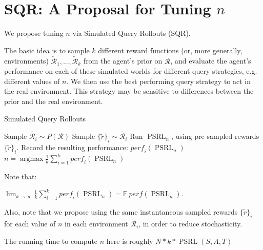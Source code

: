 \documentclass{article}
\begin{document}
\section{SQR: A Proposal for Tuning $n$}
We propose tuning $n$ via Simulated Query Rollouts (SQR). 

The basic idea is to sample $k$ different reward functions (or, more generally, environments) $\mathcal{\tilde{R}}_1, ..., \mathcal{\tilde{R}}_k$ from the agent's prior on $\mathcal{R}$, and evaluate the agent's performance on each of these simulated worlds for different query strategies, e.g. different values of $n$.
We then use the best performing query strategy to act in the real environment.
This strategy may be sensitive to differences between the prior and the real environment.



\begin{algorithm}
\caption{Simulated Query Rollouts}
\label{SQR}
\begin{algorithmic}[1]
	\State Sample $\tilde{\mathcal{R}_i} \sim P(\mathcal{R})$
	\State Sample $\{\tilde{r}\}_i \sim \tilde{\mathcal{R}_i}$
		\State Run $\mathop{PSRL}_n$, using pre-sampled rewards $\{\tilde{r}\}_i$.
		\State Record the resulting performance: $\mathit{perf}_i(\mathop{PSRL}_n)$
	\EndFor
\EndFor
\Return $n = \mathop{\mathrm{argmax}} \frac{1}{k} \sum_{i=1}^k \mathit{perf}_i(\mathop{PSRL}_n)$ 
\end{algorithmic}
\end{algorithm}

Note that:

$
\lim_{k \rightarrow \infty} \frac{1}{k} \sum_{i=1}^k \mathit{perf}_i(\mathop{PSRL}_n) = \mathbb{E} \: \mathit{perf}(\mathop{PSRL}_n).
$

Also, note that we propose using the same instantaneous sampled rewards $\{\tilde{r}\}_i$ for each value of $n$ in each environment $\tilde{\mathcal{R}_i}$, in order to reduce stochasticity.

The running time to compute $n$ here is roughly $N * k * \mathop{PSRL}(S, A, T) $

\end{document}
